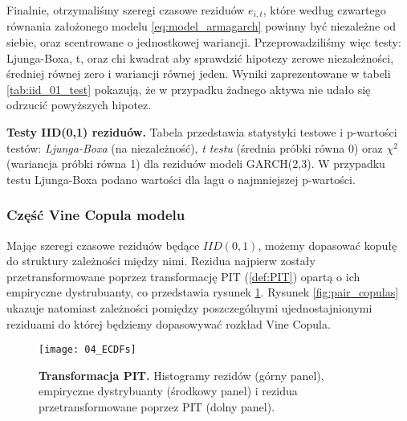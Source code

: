 Finalnie, otrzymaliśmy szeregi czasowe reziduów $e_{i,t}$, które według czwartego równania założonego modelu \ref{eq:model_armagarch} powinny być niezależne od siebie, oraz scentrowane o jednostkowej wariancji. Przeprowadziliśmy więc testy: Ljunga-Boxa, t, oraz chi kwadrat aby sprawdzić hipotezy zerowe niezależności, średniej równej zero i wariancji równej jeden. Wyniki zaprezentowane w tabeli \ref{tab:iid_01_test} pokazują, że w przypadku żadnego aktywa nie udało się odrzucić powyższych hipotez.

\begin{table}
\begin{adjustbox}{width=\columnwidth, center}	
	\centering
	
\end{adjustbox}
	\caption{\textbf{Testy IID(0,1) reziduów.} Tabela przedstawia statystyki testowe i p-wartości testów: \emph{Ljunga-Boxa} (na niezależność), \emph{t testu} (średnia próbki równa 0) oraz $\chi^2$ (wariancja próbki równa 1) dla reziduów modeli GARCH(2,3).  W przypadku testu Ljunga-Boxa podano wartości dla lagu o najmniejszej p-wartości.\label{tab:iid_01_test}}
\end{table}

\subsubsection{Część Vine Copula modelu}

Mając szeregi czasowe reziduów będące $IID(0,1)$, możemy dopasować kopułę do struktury zależności między nimi. Rezidua najpierw zostały przetransformowane poprzez transformację PIT (\ref{def:PIT}) opartą o ich empiryczne dystrubuanty, co przedstawia rysunek \ref{fig:ecdf_pit}. Rysunek \ref{fig:pair_copulas} ukazuje natomiast zależności pomiędzy poszczególnymi ujednostajnionymi reziduami do której będziemy dopasowywać rozkład Vine Copula.

\begin{figure}[h]
	\centering
	\texttt{[image: 04\_ECDFs]}
	\caption{\textbf{Transformacja PIT.} Histogramy rezidów (górny panel), empiryczne dystrybuanty (środkowy panel) i rezidua przetransformowane poprzez PIT (dolny panel). \label{fig:ecdf_pit}}
\end{figure}

